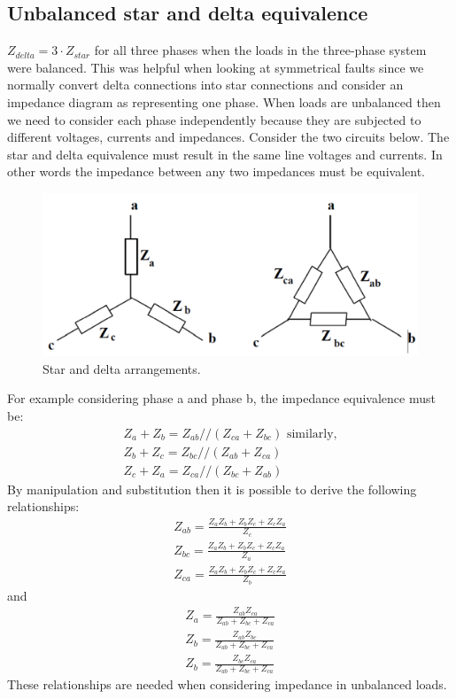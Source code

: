 \subsection{Unbalanced star and delta equivalence}
$Z_{delta} = 3\cdot Z_{star}$ for all three phases when the loads in the three-phase system were balanced. This was helpful when looking at symmetrical faults since we normally convert delta connections into star connections and consider an impedance diagram as representing one phase. When loads are unbalanced then we need to consider each phase independently because they are subjected to different voltages, currents and impedances. Consider the two circuits below. The star and delta equivalence must result in the same line voltages and currents. In other words the impedance between any two impedances must be equivalent.
\begin{figure}[H]
	\centering
	\includegraphics[width = \textwidth]{./img/figure31.png}
	\caption{Star and delta arrangements.}
\end{figure}
For example considering phase a and phase b, the impedance equivalence must be:
\begin{gather}
	Z_a + Z_b = Z_{ab} // \left(Z_{ca}+Z_{bc}\right) \textrm{ similarly,}\\
	Z_b + Z_c = Z_{bc} // \left(Z_{ab}+Z_{ca}\right)\\
	Z_c + Z_a = Z_{ca} // \left(Z_{bc}+Z_{ab}\right)
\end{gather}
By manipulation and substitution then it is possible to derive the following relationships:
\begin{gather}
	Z_{ab} = \frac{Z_aZ_b + Z_bZ_c+Z_cZ_a}{Z_c}\\
	Z_{bc} = \frac{Z_aZ_b + Z_bZ_c+Z_cZ_a}{Z_a}\\
	Z_{ca} = \frac{Z_aZ_b + Z_bZ_c+Z_cZ_a}{Z_b}
\end{gather}
and
\begin{gather}
	Z_a = \frac{Z_{ab}Z_{ca}}{Z_{ab}+Z_{bc}+Z_{ca}}\\
	Z_b = \frac{Z_{ab}Z_{bc}}{Z_{ab}+Z_{bc}+Z_{ca}}\\
	Z_b = \frac{Z_{bc}Z_{ca}}{Z_{ab}+Z_{bc}+Z_{ca}}
\end{gather}
These relationships are needed when considering impedance in unbalanced loads.
